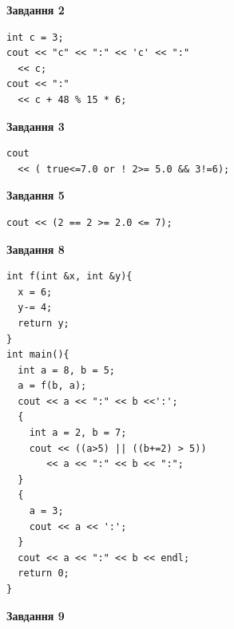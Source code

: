 \documentclass[12pt, ukrainian]{article}
\begin{document}
{\begin {large}
\begin{minipage}[t]{7.0cm}
\end{minipage}
\vline \hspace{1mm}
\begin{minipage}[t]{11.0cm}

\begin{center}
\textbf{Завдання 2}
\end{center}
\vspace{-8mm}

\begin{verbatim}
int c = 3;
cout << "c" << ":" << 'c' << ":" 
  << c;
cout << ":" 
  << c + 48 % 15 * 6;
\end{verbatim}



\begin{center}
\textbf{Завдання 3}
\end{center}
\vspace{-8mm}

\begin{verbatim}
cout 
  << ( true<=7.0 or ! 2>= 5.0 && 3!=6);
\end{verbatim}



\begin{center}
\textbf{Завдання 5}
\end{center}
\vspace{-8mm}

\begin{verbatim}
cout << (2 == 2 >= 2.0 <= 7);
\end{verbatim}



\begin{center}
\textbf{Завдання 8}
\end{center}
\vspace{-8mm}

\begin{verbatim}
int f(int &x, int &y){
  x = 6;
  y-= 4;
  return y;
}
int main(){
  int a = 8, b = 5;
  a = f(b, a);
  cout << a << ":" << b <<':';
  {
    int a = 2, b = 7;
    cout << ((a>5) || ((b+=2) > 5))
       << a << ":" << b << ":";
  }
  {
    a = 3;
    cout << a << ':';
  }
  cout << a << ":" << b << endl;
  return 0;
}
\end{verbatim}

\end{minipage}


\begin{minipage}[t]{7.0cm}

\begin{center}
\textbf{Завдання 9}
\end{center}
\vspace{-8mm}


\end{minipage}
\end{large}}
\end{document}

